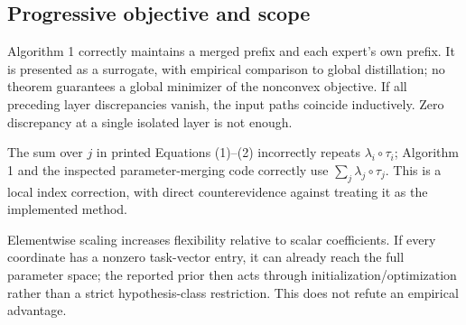 \documentclass[10pt]{article}
\begin{document}
\subsection*{Progressive objective and scope}
Algorithm 1 correctly maintains a merged prefix and each expert’s own prefix. It is presented as a surrogate, with empirical comparison to global distillation; no theorem guarantees a global minimizer of the nonconvex objective. If all preceding layer discrepancies vanish, the input paths coincide inductively. Zero discrepancy at a single isolated layer is not enough.\par
The sum over \(j\) in printed Equations (1)–(2) incorrectly repeats \(\lambda_i\circ\tau_i\); Algorithm 1 and the inspected parameter-merging code correctly use \(\sum_j\lambda_j\circ\tau_j\). This is a local index correction, with direct counterevidence against treating it as the implemented method.\par
Elementwise scaling increases flexibility relative to scalar coefficients. If every coordinate has a nonzero task-vector entry, it can already reach the full parameter space; the reported prior then acts through initialization/optimization rather than a strict hypothesis-class restriction. This does not refute an empirical advantage.\par
\end{document}
